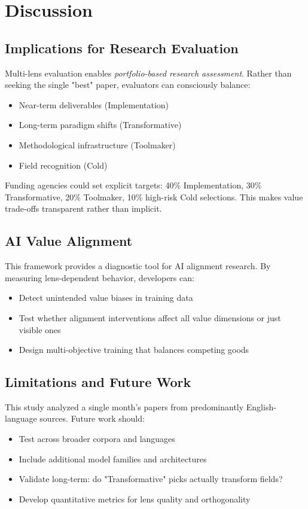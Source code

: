\documentclass{article}
\begin{document}
\section{Discussion}

\subsection{Implications for Research Evaluation}

Multi-lens evaluation enables \textit{portfolio-based research assessment}. Rather than seeking the single "best" paper, evaluators can consciously balance:
\begin{itemize}
    \item Near-term deliverables (Implementation)
    \item Long-term paradigm shifts (Transformative)
    \item Methodological infrastructure (Toolmaker)
    \item Field recognition (Cold)
\end{itemize}

Funding agencies could set explicit targets: 40\% Implementation, 30\% Transformative, 20\% Toolmaker, 10\% high-risk Cold selections. This makes value trade-offs transparent rather than implicit.

\subsection{AI Value Alignment}

This framework provides a diagnostic tool for AI alignment research. By measuring lens-dependent behavior, developers can:
\begin{itemize}
    \item Detect unintended value biases in training data
    \item Test whether alignment interventions affect all value dimensions or just visible ones
    \item Design multi-objective training that balances competing goods
\end{itemize}

\subsection{Limitations and Future Work}

This study analyzed a single month's papers from predominantly English-language sources. Future work should:
\begin{itemize}
    \item Test across broader corpora and languages
    \item Include additional model families and architectures
    \item Validate long-term: do "Transformative" picks actually transform fields?
    \item Develop quantitative metrics for lens quality and orthogonality
\end{itemize}
\end{document}
